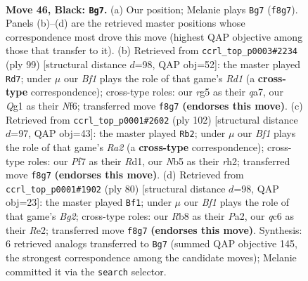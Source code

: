 \documentclass[11pt]{article}
\begin{document}
\clearpage

\begin{figure}[p]\centering
\begin{subfigure}{0.46\textwidth}\centering
\resizebox{\linewidth}{!}{%
\newchessgame
\chessboard[
  setfen={1r3bk1/1r3p2/2Q5/1n2p1R1/R3P3/3K4/3N2N1/6q1 b - - 3 46},
  showmover=false,
  pgfstyle=straightmove, color=movearrow, markmove={f8-g7}
]}
\caption{}
\end{subfigure}\hfill
\begin{subfigure}{0.46\textwidth}\centering
\resizebox{\linewidth}{!}{%
\newchessgame
\chessboard[
  setfen={3r4/Q3k3/3p1n1p/2p1rb2/2P5/Pp4P1/1P4NK/3R4 b - - 3 50},
  showmover=false,
  pgfstyle=straightmove, color=movearrow, markmove={d8-d7}
]}
\caption{}
\end{subfigure}
\\[4pt]
\begin{subfigure}{0.46\textwidth}\centering
\resizebox{\linewidth}{!}{%
\newchessgame
\chessboard[
  setfen={5k2/5p2/5q2/P1pQ4/2r5/6P1/R4P1r/K2R4 w - - 3 52},
  showmover=false,
  pgfstyle=straightmove, color=movearrow, markmove={a2-b2}
]}
\caption{}
\end{subfigure}\hfill
\begin{subfigure}{0.46\textwidth}\centering
\resizebox{\linewidth}{!}{%
\newchessgame
\chessboard[
  setfen={8/p5rk/2PQ4/3n1p2/5P2/3qp3/P3R1B1/7K w - - 5 41},
  showmover=false,
  pgfstyle=straightmove, color=movearrow, markmove={g2-f1}
]}
\caption{}
\end{subfigure}
\caption{\textbf{Move 46, Black: \texttt{Bg7}.} (a) Our position; Melanie plays \texttt{Bg7} (\texttt{f8g7}). Panels (b)--(d) are the retrieved master positions whose correspondence most drove this move (highest QAP objective among those that transfer to it). (b) Retrieved from \texttt{ccrl\_top\_p0003\#2234} (ply 99) [structural distance $d$=98, QAP obj=52]: the master played \texttt{Rd7}; under $\mu$ our \emph{Bf1} plays the role of that game's \emph{Rd1} (a \textbf{cross-type} correspondence); cross-type roles: our \emph{r}g5 as their \emph{q}a7, our \emph{Q}g1 as their \emph{N}f6; transferred move \texttt{f8g7} \textbf{(endorses this move)}. (c) Retrieved from \texttt{ccrl\_top\_p0001\#2602} (ply 102) [structural distance $d$=97, QAP obj=43]: the master played \texttt{Rb2}; under $\mu$ our \emph{Bf1} plays the role of that game's \emph{Ra2} (a \textbf{cross-type} correspondence); cross-type roles: our \emph{P}f7 as their \emph{R}d1, our \emph{N}b5 as their \emph{r}h2; transferred move \texttt{f8g7} \textbf{(endorses this move)}. (d) Retrieved from \texttt{ccrl\_top\_p0001\#1902} (ply 80) [structural distance $d$=98, QAP obj=23]: the master played \texttt{Bf1}; under $\mu$ our \emph{Bf1} plays the role of that game's \emph{Bg2}; cross-type roles: our \emph{R}b8 as their \emph{P}a2, our \emph{q}c6 as their \emph{R}e2; transferred move \texttt{f8g7} \textbf{(endorses this move)}. Synthesis: 6 retrieved analogs transferred to \texttt{Bg7} (summed QAP objective 145, the strongest correspondence among the candidate moves); Melanie committed it via the \texttt{search} selector.}
\label{fig:thought-m91}
\end{figure}
\end{document}
